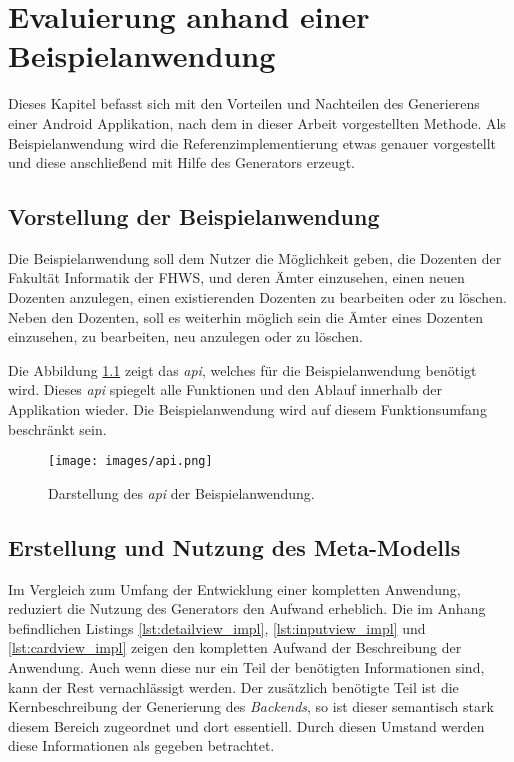 \chapter{Evaluierung anhand einer Beispielanwendung}
Dieses Kapitel befasst sich mit den Vorteilen und Nachteilen des Generierens einer Android Applikation, nach dem in dieser Arbeit vorgestellten Methode. Als Beispielanwendung wird die Referenzimplementierung etwas genauer vorgestellt und diese anschließend mit Hilfe des Generators erzeugt.

\section{Vorstellung der Beispielanwendung}

Die Beispielanwendung soll dem Nutzer die Möglichkeit geben, die Dozenten der Fakultät Informatik der FHWS, und deren Ämter einzusehen, einen neuen Dozenten anzulegen, einen existierenden Dozenten zu bearbeiten oder zu löschen. Neben den Dozenten, soll es weiterhin möglich sein die Ämter eines Dozenten einzusehen, zu bearbeiten, neu anzulegen oder zu löschen.

Die Abbildung \ref{fig:api} zeigt das \textit{\acf{api}}, welches für die Beispielanwendung benötigt wird. Dieses\textit{ \ac{api}} spiegelt alle Funktionen und den Ablauf innerhalb der Applikation wieder. Die Beispielanwendung wird auf diesem Funktionsumfang beschränkt sein.

\begin{figure}[H]
	\begin{center}
		\texttt{[image: images/api.png]}
		\caption{Darstellung des \textit{\ac{api}} der Beispielanwendung.}
		\label{fig:api}
	\end{center}
\end{figure}

\section{Erstellung und Nutzung des Meta-Modells}

Im Vergleich zum Umfang der Entwicklung einer kompletten Anwendung, reduziert die Nutzung des Generators den Aufwand erheblich. Die im Anhang befindlichen Listings \ref{lst:detailview_impl}, \ref{lst:inputview_impl} und \ref{lst:cardview_impl} zeigen den kompletten Aufwand der Beschreibung der Anwendung. Auch wenn diese nur ein Teil der benötigten Informationen sind, kann der Rest vernachlässigt werden. Der zusätzlich benötigte Teil ist die Kernbeschreibung der Generierung des \textit{Backends}, so ist dieser semantisch stark diesem Bereich zugeordnet und dort essentiell. Durch diesen Umstand werden diese Informationen als gegeben betrachtet.

